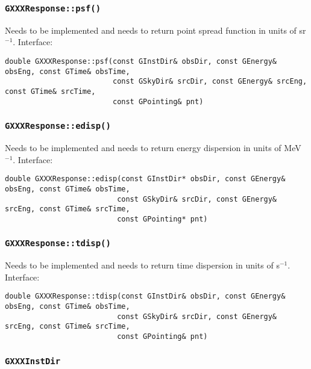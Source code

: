 \documentclass{article}[12pt,a4]
\begin{document}
\subsubsection{{\tt GXXXResponse::psf()}}

Needs to be implemented and needs to return point spread function in units of sr$^{-1}$.
Interface:
\begin{verbatim}
double GXXXResponse::psf(const GInstDir& obsDir, const GEnergy& obsEng, const GTime& obsTime,
                         const GSkyDir& srcDir, const GEnergy& srcEng, const GTime& srcTime,
                         const GPointing& pnt)
\end{verbatim}


\subsubsection{{\tt GXXXResponse::edisp()}}

Needs to be implemented and needs to return energy dispersion in units of MeV$^{-1}$.
Interface:
\begin{verbatim}
double GXXXResponse::edisp(const GInstDir* obsDir, const GEnergy& obsEng, const GTime& obsTime,
                          const GSkyDir& srcDir, const GEnergy& srcEng, const GTime& srcTime,
                          const GPointing* pnt)
\end{verbatim}


\subsubsection{{\tt GXXXResponse::tdisp()}}

Needs to be implemented and needs to return time dispersion in units of s$^{-1}$.
Interface:
\begin{verbatim}
double GXXXResponse::tdisp(const GInstDir& obsDir, const GEnergy& obsEng, const GTime& obsTime,
                          const GSkyDir& srcDir, const GEnergy& srcEng, const GTime& srcTime,
                          const GPointing& pnt)
\end{verbatim}


\subsubsection{{\tt GXXXInstDir}}
\end{document}
